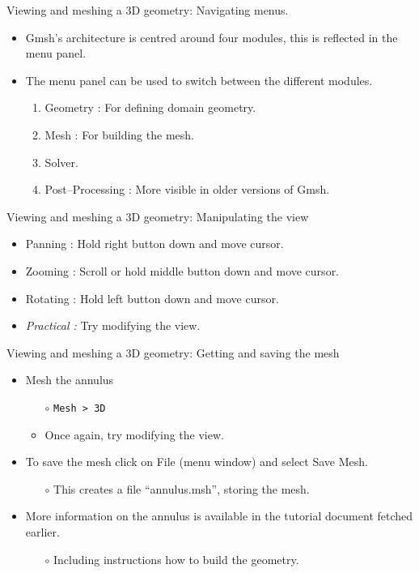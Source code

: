 \documentclass[t]{beamer}
\begin{document}
\begin{frame}{Viewing and meshing a 3D geometry: Navigating menus.}
   \begin{itemize}
     \item Gmsh's architecture is centred around four modules, this is reflected in the menu panel.\\[10pt]
     \item The menu panel can be used to switch between the different modules.\\[10pt]
     \begin{enumerate}
       \item Geometry : For defining domain geometry.
       \item Mesh : For building the mesh.
       \item Solver.
       \item Post--Processing : More visible in older versions of Gmsh.
     \end{enumerate}
   \end{itemize}
\end{frame}

\begin{frame}{Viewing and meshing a 3D geometry: Manipulating the view}
\begin{itemize}
\item Panning : Hold right button down and move cursor.
\item Zooming : Scroll or hold middle button down and move cursor.
\item Rotating : Hold left button down and move cursor.
\item \emph{Practical :} Try modifying the view.
\end{itemize}
\end{frame}

\begin{frame}{Viewing and meshing a 3D geometry: Getting and saving the mesh}
\begin{itemize}
\item Mesh the annulus
\begin{itemize}
  \item[$\circ$] \lstinline{Mesh > 3D}
  \item[$\circ$] Once again, try modifying the view.
\end{itemize}
\vspace{5pt}
\item To save the mesh click on File (menu window) and select Save Mesh.
\begin{itemize}
  \item[$\circ$] This creates a file ``annulus.msh'', storing the mesh.
\end{itemize}
\vspace{5pt}
\item More information on the annulus is available in the tutorial document fetched earlier.
\begin{itemize}
  \item[$\circ$] Including instructions how to build the geometry.
\end{itemize}
\end{itemize}
\end{frame}
\end{document}
